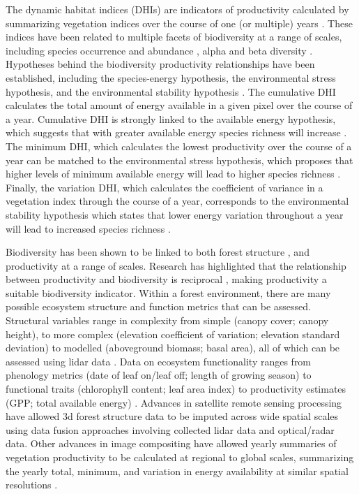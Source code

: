 \documentclass[
  authoryear,
  review,
  3p,
  twocolumn]{elsarticle}
\begin{document}
The dynamic habitat indices (DHIs) are indicators of productivity
calculated by summarizing vegetation indices over the course of one (or
multiple) years \citep{radeloff2019}. These indices have been related to
multiple facets of biodiversity at a range of scales, including species
occurrence and abundance \citep{razenkova2020}, alpha
\citep{radeloff2019} and beta diversity \citep{andrew2012}. Hypotheses
behind the biodiversity productivity relationships have been
established, including the species-energy hypothesis, the environmental
stress hypothesis, and the environmental stability hypothesis
\citep{coops2019}. The cumulative DHI calculates the total amount of
energy available in a given pixel over the course of a year. Cumulative
DHI is strongly linked to the available energy hypothesis, which
suggests that with greater available energy species richness will
increase \citep{wright1983}. The minimum DHI, which calculates the
lowest productivity over the course of a year can be matched to the
environmental stress hypothesis, which proposes that higher levels of
minimum available energy will lead to higher species richness
\citep{currie2004}. Finally, the variation DHI, which calculates the
coefficient of variance in a vegetation index through the course of a
year, corresponds to the environmental stability hypothesis which states
that lower energy variation throughout a year will lead to increased
species richness \citep{williams2008}.

Biodiversity has been shown to be linked to both forest structure
\citep{guo2017, gao2014}, and productivity \citep{radeloff2019} at a
range of scales. Research has highlighted that the relationship between
productivity and biodiversity is reciprocal \citep{worm2003}, making
productivity a suitable biodiversity indicator. Within a forest
environment, there are many possible ecosystem structure and function
metrics that can be assessed. Structural variables range in complexity
from simple (canopy cover; canopy height), to more complex (elevation
coefficient of variation; elevation standard deviation) to modelled
(aboveground biomass; basal area), all of which can be assessed using
lidar data \citep{coops2021}. Data on ecosystem functionality ranges
from phenology metrics (date of leaf on/leaf off; length of growing
season) to functional traits (chlorophyll content; leaf area index) to
productivity estimates (GPP; total available energy)
\citep{pettorelli2018}. Advances in satellite remote sensing processing
have allowed 3d forest structure data to be imputed across wide spatial
scales \citep{matasci2018, coops2021} using data fusion approaches
involving collected lidar data and optical/radar data. Other advances in
image compositing have allowed yearly summaries of vegetation
productivity to be calculated at regional to global scales, summarizing
the yearly total, minimum, and variation in energy availability at
similar spatial resolutions \citep{radeloff2019}.
\end{document}
